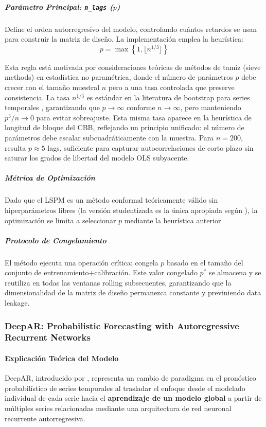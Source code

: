 \subparagraph{Parámetro Principal: \texttt{n\_lags} ($p$)}
Define el orden autorregresivo del modelo, controlando cuántos retardos se usan para construir la matriz de diseño. La implementación emplea la heurística:
\begin{equation}
p = \max\left\{1, \lfloor n^{1/3} \rfloor\right\}
\end{equation}

Esta regla está motivada por consideraciones teóricas de métodos de tamiz (sieve methods) en estadística no paramétrica, donde el número de parámetros $p$ debe crecer con el tamaño muestral $n$ pero a una tasa controlada que preserve consistencia. La tasa $n^{1/3}$ es estándar en la literatura de bootstrap para series temporales \parencite{Buhlmann1997, politis2004automatic}, garantizando que $p \to \infty$ conforme $n \to \infty$, pero manteniendo $p^3/n \to 0$ para evitar sobreajuste. Esta misma tasa aparece en la heurística de longitud de bloque del CBB, reflejando un principio unificado: el número de parámetros debe escalar subcuadráticamente con la muestra. Para $n = 200$, resulta $p \approx 5$ lags, suficiente para capturar autocorrelaciones de corto plazo sin saturar los grados de libertad del modelo OLS subyacente.

\subparagraph{Métrica de Optimización}
Dado que el LSPM es un método conformal teóricamente válido sin hiperparámetros libres (la versión studentizada es la única apropiada según \textcite{Vovk2022}), la optimización se limita a seleccionar $p$ mediante la heurística anterior.

\subparagraph{Protocolo de Congelamiento}
El método ejecuta una operación crítica: congela $p$ basado en el tamaño del conjunto de entrenamiento+calibración. Este valor congelado $p^*$ se almacena  y se reutiliza en todas las ventanas rolling subsecuentes, garantizando que la dimensionalidad de la matriz de diseño permanezca constante y previniendo data leakage.


\subsubsection{DeepAR: Probabilistic Forecasting with Autoregressive Recurrent Networks}
\label{subsec:DeepAR}
\paragraph{Explicación Teórica del Modelo}

DeepAR, introducido por \textcite{Salinas2020}, representa un cambio de paradigma en el pronóstico probabilístico de series temporales al trasladar el enfoque desde el modelado individual de cada serie hacia el \textbf{aprendizaje de un modelo global} a partir de múltiples series relacionadas mediante una arquitectura de red neuronal recurrente autorregresiva.

